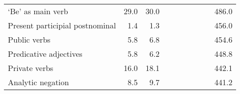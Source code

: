 \begin{table}[!t]
\begin{tabular*}{\linewidth}{@{\extracolsep{\fill}}lrrrrrrrrr}
‘Be’ as main verb & 29.0 & 30.0 & {\cellcolor[HTML]{F4A582}{\textcolor[HTML]{000000}{61\%}}} & {\cellcolor[HTML]{F4A582}{\textcolor[HTML]{000000}{63\%}}} & {\cellcolor[HTML]{F7F7F7}{\textcolor[HTML]{000000}{107\%}}} & {\cellcolor[HTML]{F7F7F7}{\textcolor[HTML]{000000}{100\%}}} & {\cellcolor[HTML]{F7F7F7}{\textcolor[HTML]{000000}{108\%}}} & {\cellcolor[HTML]{F7F7F7}{\textcolor[HTML]{000000}{101\%}}} & 486.0 \\ 
Present participial postnominal & 1.4 & 1.3 & {\cellcolor[HTML]{4393C3}{\textcolor[HTML]{FFFFFF}{293\%}}} & {\cellcolor[HTML]{4393C3}{\textcolor[HTML]{FFFFFF}{243\%}}} & {\cellcolor[HTML]{D1E5F0}{\textcolor[HTML]{000000}{125\%}}} & {\cellcolor[HTML]{D1E5F0}{\textcolor[HTML]{000000}{124\%}}} & {\cellcolor[HTML]{F7F7F7}{\textcolor[HTML]{000000}{101\%}}} & {\cellcolor[HTML]{D1E5F0}{\textcolor[HTML]{000000}{113\%}}} & 456.0 \\ 
Public verbs & 5.8 & 6.8 & {\cellcolor[HTML]{F4A582}{\textcolor[HTML]{000000}{53\%}}} & {\cellcolor[HTML]{F4A582}{\textcolor[HTML]{000000}{63\%}}} & {\cellcolor[HTML]{F4A582}{\textcolor[HTML]{000000}{65\%}}} & {\cellcolor[HTML]{F4A582}{\textcolor[HTML]{000000}{67\%}}} & {\cellcolor[HTML]{D1E5F0}{\textcolor[HTML]{000000}{119\%}}} & {\cellcolor[HTML]{D1E5F0}{\textcolor[HTML]{000000}{112\%}}} & 454.6 \\ 
Predicative adjectives & 5.8 & 6.2 & {\cellcolor[HTML]{FDDBC7}{\textcolor[HTML]{000000}{84\%}}} & {\cellcolor[HTML]{F7F7F7}{\textcolor[HTML]{000000}{90\%}}} & {\cellcolor[HTML]{92C5DE}{\textcolor[HTML]{000000}{140\%}}} & {\cellcolor[HTML]{D1E5F0}{\textcolor[HTML]{000000}{131\%}}} & {\cellcolor[HTML]{92C5DE}{\textcolor[HTML]{000000}{169\%}}} & {\cellcolor[HTML]{92C5DE}{\textcolor[HTML]{000000}{154\%}}} & 448.8 \\ 
Private verbs & 16.0 & 18.1 & {\cellcolor[HTML]{F7F7F7}{\textcolor[HTML]{000000}{91\%}}} & {\cellcolor[HTML]{FDDBC7}{\textcolor[HTML]{000000}{85\%}}} & {\cellcolor[HTML]{D1E5F0}{\textcolor[HTML]{000000}{122\%}}} & {\cellcolor[HTML]{D1E5F0}{\textcolor[HTML]{000000}{113\%}}} & {\cellcolor[HTML]{D1E5F0}{\textcolor[HTML]{000000}{128\%}}} & {\cellcolor[HTML]{D1E5F0}{\textcolor[HTML]{000000}{126\%}}} & 442.1 \\ 
Analytic negation & 8.5 & 9.7 & {\cellcolor[HTML]{F4A582}{\textcolor[HTML]{000000}{73\%}}} & {\cellcolor[HTML]{F4A582}{\textcolor[HTML]{000000}{61\%}}} & {\cellcolor[HTML]{FDDBC7}{\textcolor[HTML]{000000}{80\%}}} & {\cellcolor[HTML]{FDDBC7}{\textcolor[HTML]{000000}{78\%}}} & {\cellcolor[HTML]{D1E5F0}{\textcolor[HTML]{000000}{113\%}}} & {\cellcolor[HTML]{F7F7F7}{\textcolor[HTML]{000000}{107\%}}} & 441.2 \\ 

\end{tabular*}
\end{table}
